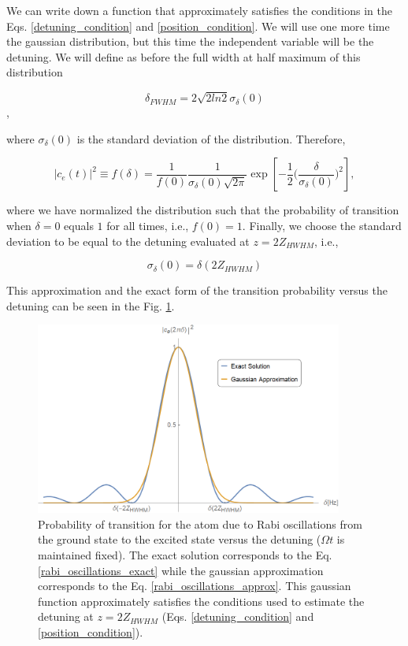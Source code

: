 \documentclass{article}
\begin{document}
We can write down a function that approximately satisfies the conditions in the Eqs. \ref{detuning_condition} and \ref{position_condition}. We will use one more time the gaussian distribution, but this time the independent variable will be the detuning. We will define as before the full width at half maximum of this distribution

\begin{equation}\label{FWHM_normal_distribution}
\delta_{FWHM} = 2\sqrt{2ln2} \sigma_{\delta}(0)
\end{equation},

where $\sigma_{\delta}(0)$ is the standard deviation of the distribution.
Therefore,

\begin{equation}\label{rabi_oscillations_approx}
  |c_{e}(t)|^{2} \equiv f(\delta) = \frac{1}{f (0)} \frac{1}{\sigma_{\delta}(0) \sqrt{2 \pi}} \exp \left[-\frac{1}{2}\bigg(\frac{\delta}{\sigma_{\delta}(0)}\bigg)^{2} \right],
\end{equation}

where we have normalized the distribution such that the probability of transition when $\delta = 0$ equals $1$ for all times, i.e., $f(0)=1$. Finally, we choose the standard deviation to be equal to the detuning evaluated at  $z=2Z_{HWHM}$, i.e.,

\begin{equation}
    \sigma_{\delta}(0) = \delta(2Z_{HWHM})
\end{equation}

This approximation and the exact form of the transition probability versus the detuning can be seen in the Fig. \ref{ce2_VS_detuning}.

\begin{figure}
    \centering
    \includegraphics[width=0.9\textwidth]{ce2_VS_detuning_general.png}
     \caption{Probability of transition for the atom due to Rabi oscillations from the ground state to the excited state versus the detuning ($\Omega t$ is maintained fixed). The exact solution corresponds to the Eq. \ref{rabi_oscillations_exact} while the gaussian approximation corresponds to the Eq. \ref{rabi_oscillations_approx}. This gaussian function approximately satisfies the conditions used to estimate the detuning at $z=2Z_{HWHM}$ (Eqs. \ref{detuning_condition} and \ref{position_condition}).}
     \label{ce2_VS_detuning}
\end{figure}
\end{document}
